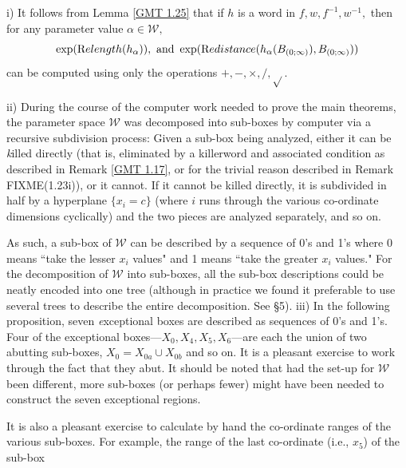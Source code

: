 \begin{remark} i)  It follows from Lemma \ref{GMT 1.25} that if $h$ is a word in $f,w,f^{-1},w^{-1},$ then for any
parameter value $\alpha\in {\mathcal W},$
$$\exp({\textrm Relength}(h_\alpha)), \hbox{ and }
  \exp({\textrm Redistance}(h_\alpha(B_{(0;\infty)}), B_{(0;\infty)}))$$ can be computed using only the
operations $+, -, \times, /, \sqrt{}.$
\end{remark} %
 ii) During the course of the computer work needed to prove the main theorems, the parameter space
${\mathcal W}$ was decomposed into sub-boxes by computer via a recursive subdivision process:
Given a sub-box  being analyzed, either it can be {\textit killed directly} (that is, eliminated by a killerword and associated condition as described in
Remark \ref{GMT 1.17},
or for the trivial reason described in Remark FIXME(1.23i)), or it cannot.  
If it cannot be killed directly, it is subdivided in half by a hyperplane
$\{x_i = c \}$ (where $i$ runs through the various co-ordinate dimensions
cyclically) and the two pieces are analyzed separately, and so on. 

As such, a sub-box of ${\mathcal W}$ can be described by a sequence of 0's and 1's where 0 means ``take the lesser $x_i$ values" and 1 means ``take the greater $x_i$ values."  
For the decomposition of ${\mathcal W}$ into sub-boxes, all the 
sub-box descriptions could be neatly encoded into one tree (although in practice we found it preferable to use several trees to describe the entire
decomposition.  See \S 5).
iii) In the following proposition, seven {\textit exceptional boxes} are described as sequences of 0's and 1's.  
Four of the exceptional boxes---$X_0, X_4, X_5, X_6$---are each the union of two abutting sub-boxes, $X_0 = X_{0a} \cup X_{0b}$ and so on.  It is a pleasant exercise to work through the fact that they abut.  
It should be noted that had the set-up for ${\mathcal W}$ been different, more sub-boxes (or perhaps fewer) might have been needed to construct the seven
exceptional regions. 

It is also a pleasant exercise to calculate by hand the co-ordinate ranges of the various sub-boxes.  For example, the range of the last co-ordinate (i.e., $x_5$) of the sub-box 
\eject

